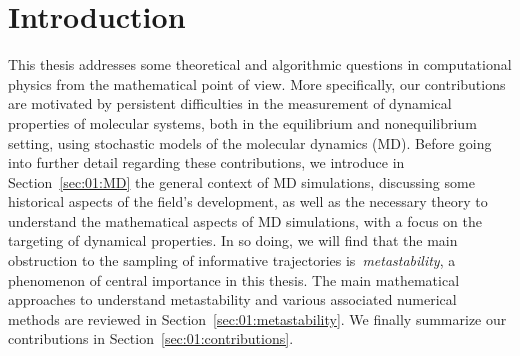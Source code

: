 \chapter{Introduction}
\label{chap:introduction}
This thesis addresses some theoretical and algorithmic questions in computational physics from the mathematical point of view. More specifically, our contributions are motivated by persistent difficulties in the measurement of dynamical properties of molecular systems, both in the equilibrium and nonequilibrium setting, using stochastic models of the molecular dynamics (MD).
Before going into further detail regarding these contributions, we introduce in Section~\ref{sec:01:MD} the general context of MD simulations, discussing some historical aspects of the field's development, as well as the necessary theory to understand the mathematical aspects of MD simulations, with a focus on the targeting of dynamical properties.
In so doing, we will find that the main obstruction to the sampling of informative trajectories is~\textit{metastability}, a phenomenon of central importance in this thesis. The main mathematical approaches to understand metastability and various associated numerical methods are reviewed in Section~\ref{sec:01:metastability}. We finally summarize our contributions in Section~\ref{sec:01:contributions}.

